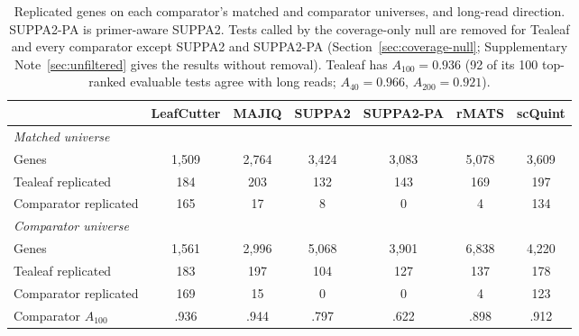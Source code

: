 \documentclass[11pt]{article}
\begin{document}
\begin{table}[ht]
\centering
\small
\setlength{\tabcolsep}{4pt}
\begin{tabular}{lcccccc}
\toprule
 & LeafCutter & MAJIQ & SUPPA2 & SUPPA2-PA & rMATS & scQuint\\
\midrule
\multicolumn{7}{l}{\emph{Matched universe}}\\
Genes & 1{,}509 & 2{,}764 & 3{,}424 & 3{,}083 & 5{,}078 & 3{,}609\\
Tealeaf replicated & 184 & 203 & 132 & 143 & 169 & 197\\
Comparator replicated & 165 & 17 & 8 & 0 & 4 & 134\\
\midrule
\multicolumn{7}{l}{\emph{Comparator universe}}\\
Genes & 1{,}561 & 2{,}996 & 5{,}068 & 3{,}901 & 6{,}838 & 4{,}220\\
Tealeaf replicated & 183 & 197 & 104 & 127 & 137 & 178\\
Comparator replicated & 169 & 15 & 0 & 0 & 4 & 123\\
\midrule
Comparator $A_{100}$ & .936 & .944 & .797 & .622 & .898 & .912\\
\bottomrule
\end{tabular}
\caption{Replicated genes on each comparator's matched and comparator universes, and long-read direction. SUPPA2-PA is primer-aware SUPPA2. Tests called by the coverage-only null are removed for Tealeaf and every comparator except SUPPA2 and SUPPA2-PA (Section~\ref{sec:coverage-null}; Supplementary Note~\ref{sec:unfiltered} gives the results without removal). Tealeaf has $A_{100}=0.936$ (92 of its 100 top-ranked evaluable tests agree with long reads; $A_{40}=0.966$, $A_{200}=0.921$).}
\label{tab:results}
\end{table}
\end{document}
